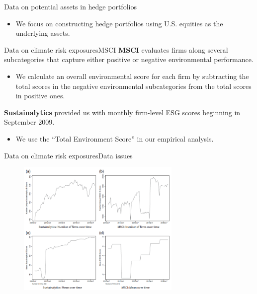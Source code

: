 \begin{frame}{Data on potential assets in hedge portfolios}
	\begin{itemize}		
		\item We focus on constructing hedge portfolios using U.S. equities as the underlying assets.
	\end{itemize}
\end{frame}

\begin{frame}{Data on climate risk exposures}{MSCI}
	\textbf{MSCI} evaluates firms along several subcategories that capture either positive or negative environmental performance.
	\begin{itemize}	
		\item We calculate an overall environmental score for each firm by subtracting the total scores in the negative environmental subcategories from the total scores in positive ones.
	\end{itemize}
	\textbf{Sustainalytics} provided us with monthly firm-level ESG scores beginning in September 2009.
	\begin{itemize}
		\item We use the “Total Environment Score” in our empirical analysis.
	\end{itemize}
\end{frame}

\begin{frame}{Data on climate risk exposures}{Data issues}
	\begin{figure}[hbdp]
		\centering
		\includegraphics[width=0.7\textwidth]{performance.png}
	\end{figure} 
\end{frame}

